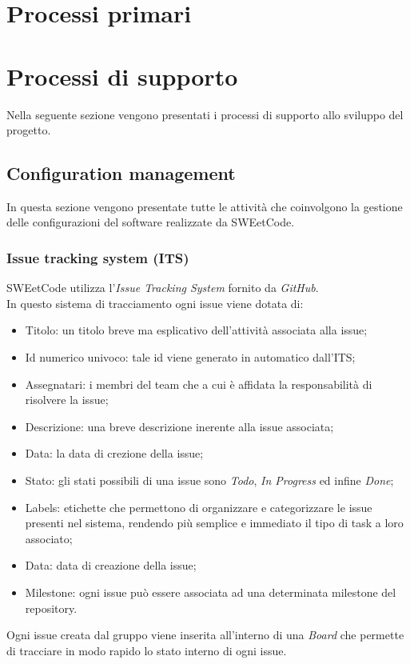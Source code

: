 \documentclass[10pt, a4paper]{article}
\begin{document}
\newpage
\section{Processi primari}

\newpage
\section{Processi di supporto}
Nella seguente sezione vengono presentati i processi di supporto allo sviluppo del progetto.

\subsection{Configuration management}
In questa sezione vengono presentate tutte le attività che coinvolgono la gestione delle configurazioni del software realizzate da SWEetCode.

\subsubsection{Issue tracking system (ITS)} %
SWEetCode utilizza l'\textit{Issue Tracking System} fornito da \textit{GitHub}.\\
In questo sistema di tracciamento ogni issue viene dotata di:
\begin{itemize}
    \item Titolo: un titolo breve ma esplicativo dell'attività associata alla issue;
    \item Id numerico univoco: tale id viene generato in automatico dall'ITS;
    \item Assegnatari: i membri del team che a cui è affidata la responsabilità di risolvere la issue;
    \item Descrizione: una breve descrizione inerente alla issue associata;
    \item Data: la data di crezione della issue;
    \item Stato: gli stati possibili di una issue sono \textit{Todo}, \textit{In Progress} ed infine \textit{Done};
    \item Labels: etichette che permettono di organizzare e categorizzare le issue presenti nel sistema, rendendo più semplice e immediato il tipo di task a loro associato;
    \item Data: data di creazione della issue;
    \item Milestone: ogni issue può essere associata ad una determinata milestone del repository.
\end{itemize}
Ogni issue creata dal gruppo viene inserita all'interno di una \textit{Board} che permette di tracciare in modo rapido lo stato interno di ogni issue.
\end{document}
